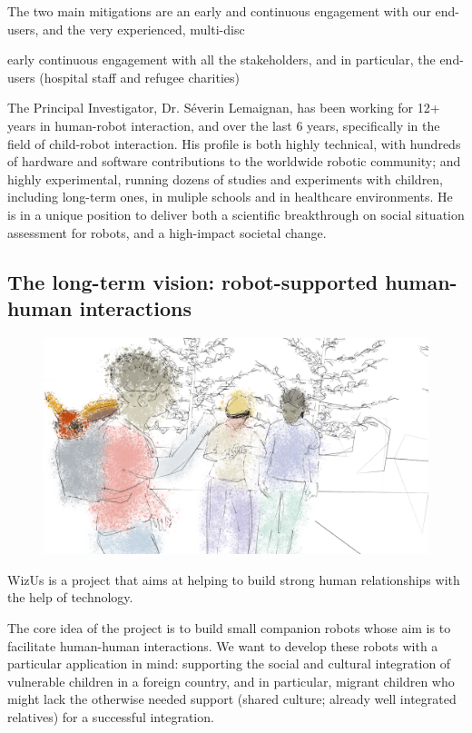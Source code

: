 \documentclass[11pt]{article}
\newcommand{\project}{WizUs\xspace}
\begin{document}
The two main mitigations are an early and continuous engagement with our
end-users, and the very experienced, multi-disc

early continuous engagement with all the
stakeholders, and in particular, the end-users (hospital staff and refugee
charities)

The Principal Investigator, Dr.
Séverin Lemaignan, has been working for 12+ years in human-robot interaction,
and over the last 6 years, specifically in the field of child-robot interaction.
His profile is both highly technical, with hundreds of hardware and software
contributions to the worldwide robotic community; and highly experimental,
running dozens of studies and experiments with children, including long-term
ones, in muliple schools and in healthcare environments. He is in a unique
position to deliver both a scientific breakthrough on social situation
assessment for robots, and a high-impact societal change.

\subsection{The long-term vision: robot-supported human-human interactions}


\begin{figure}[!htbp]
    \centering
    \includegraphics[width=0.9\linewidth]{figs/render5-colors.png}
\end{figure}

\project is a project that aims at helping to build strong human
relationships with the help of technology.

The core idea of the project is to build small companion robots whose
aim is to facilitate human-human interactions. We want to develop these
robots with a particular application in mind: supporting the social and
cultural integration of vulnerable children in a foreign country, and in
particular, migrant children who might lack the otherwise needed support
(shared culture; already well integrated relatives) for a successful
integration.
\end{document}
